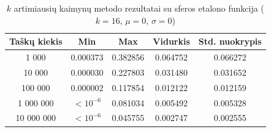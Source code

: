 \begin{table}[H]
    \centering
    \begin{tabular}{|c|c|c|c|c|}
        \hline
        \textbf{Taškų kiekis} & \textbf{Min} & \textbf{Max} & \textbf{Vidurkis} & \textbf{Std. nuokrypis} \\ \hline
        1 000        & 0.000373 & 0.382856 & 0.064752 & 0.066272 \\ \hline
        10 000       & 0.000030 & 0.227803 & 0.031480 & 0.031652 \\ \hline
        100 000      & 0.000002 & 0.117854 & 0.012122 & 0.012159 \\ \hline
        1 000 000    & $<10^{-6}$ & 0.081034 & 0.005492 & 0.005328 \\ \hline
        10 000 000   & $<10^{-6}$ & 0.045755 & 0.002747 & 0.002555 \\ \hline
    \end{tabular}
    \caption{$k$ artimiausių kaimynų metodo rezultatai su sferos etalono funkcija ($k = 16$, $\mu = 0$, $\sigma = 0$)}
\end{table}